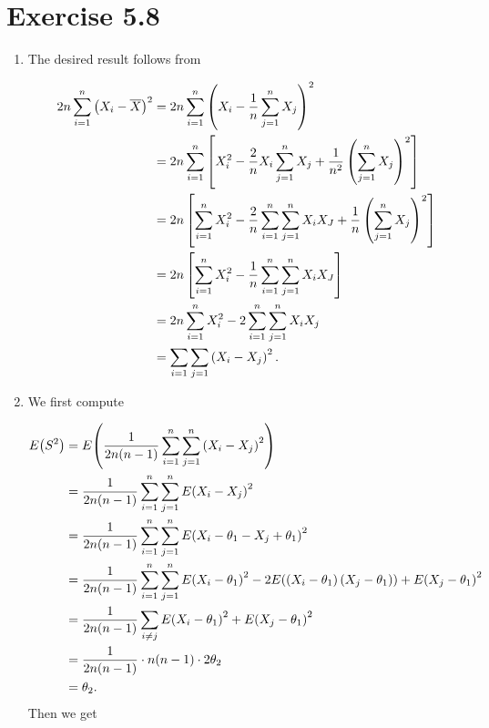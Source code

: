 \documentclass[12pt,letterpaper,reqno]{amsart}
\numberwithin{equation}{subsection}
\begin{document}
\newpage
\section{Exercise 5.8}

\begin{enumerate}[label=(\alph*),leftmargin=*]
    \item The desired result follows from
    
    \begin{align*}
        2n \sum_{i=1}^n \left( X_i - \overline{{X}} \right)^2 &= 2n \sum_{i=1}^n \left( X_i - \frac{1}{n} \sum_{j=1}^n X_j \right)^2 \\
        &= 2n \sum_{i=1}^n \left[ X_i^2 - \frac{2}{n} X_i \sum_{j=1}^n X_j + \frac{1}{n^2} \left( \sum_{j=1}^n X_j \right)^2 \right] \\
        &= 2n \left[ \sum_{i=1}^n X_i^2 - \frac{2}{n} \sum_{i=1}^n \sum_{j=1}^n X_i X_J + \frac{1}{n} \left( \sum_{j=1}^n X_j \right)^2 \right] \\
        &= 2n \left[ \sum_{i=1}^n X_i^2 - \frac{1}{n} \sum_{i=1}^n \sum_{j=1}^n X_i X_J \right] \\
        &= 2n \sum_{i=1}^n X_i^2 - 2 \sum_{i=1}^n \sum_{j=1}^n X_i X_j \\
        &= \sum_{i=1} \sum_{j=1} \left( X_i - X_j \right)^2.
    \end{align*}
    
    \item We first compute
    
    \begin{align*}
        \fun{E}{S^2} &= \fun{E}{ \frac{1}{2n(n-1)} \sum_{i=1}^n \sum_{j=1}^n \left( X_i - X_j \right)^2} \\
        &= \frac{1}{2n(n-1)} \sum_{i=1}^n \sum_{j=1}^n \fun{E}{X_i - X_j}^2 \\
        &= \frac{1}{2n(n-1)} \sum_{i=1}^n \sum_{j=1}^n \fun{E}{X_i - \theta_1 - X_j + \theta_1}^2 \\
        &= \frac{1}{2n(n-1)} \sum_{i=1}^n \sum_{j=1}^n \fun{E}{X_i - \theta_1}^2 - 2 \fun{E}{\left( X_i - \theta_1 \right) \left( X_j - \theta_1 \right)} + \fun{E}{X_j - \theta_1}^2 \\
        &= \frac{1}{2n(n-1)} \sum_{i \not= j} \fun{E}{X_i - \theta_1}^2 + \fun{E}{X_j - \theta_1}^2 \\
        &= \frac{1}{2n(n-1)} \cdot n(n-1) \cdot 2\theta_2 \\
        &= \theta_2.
    \end{align*}
    Then we get
    

\end{enumerate}
\end{document}
